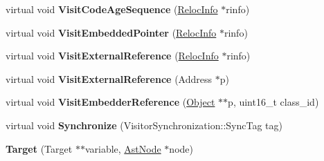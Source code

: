 \begin{DoxyCompactItemize}
\item 
\hypertarget{classv8_1_1internal_1_1_b_a_s_e___e_m_b_e_d_d_e_d_a784f217135268a1d65a614da296acf48}{}virtual void {\bfseries Visit\+Code\+Age\+Sequence} (\hyperlink{classv8_1_1internal_1_1_reloc_info}{Reloc\+Info} $\ast$rinfo)\label{classv8_1_1internal_1_1_b_a_s_e___e_m_b_e_d_d_e_d_a784f217135268a1d65a614da296acf48}

\item 
\hypertarget{classv8_1_1internal_1_1_b_a_s_e___e_m_b_e_d_d_e_d_af78b91de0e0d247404746211121b8a2e}{}virtual void {\bfseries Visit\+Embedded\+Pointer} (\hyperlink{classv8_1_1internal_1_1_reloc_info}{Reloc\+Info} $\ast$rinfo)\label{classv8_1_1internal_1_1_b_a_s_e___e_m_b_e_d_d_e_d_af78b91de0e0d247404746211121b8a2e}

\item 
\hypertarget{classv8_1_1internal_1_1_b_a_s_e___e_m_b_e_d_d_e_d_ae9355013687e3d39c76d4559bc3f508e}{}virtual void {\bfseries Visit\+External\+Reference} (\hyperlink{classv8_1_1internal_1_1_reloc_info}{Reloc\+Info} $\ast$rinfo)\label{classv8_1_1internal_1_1_b_a_s_e___e_m_b_e_d_d_e_d_ae9355013687e3d39c76d4559bc3f508e}

\item 
\hypertarget{classv8_1_1internal_1_1_b_a_s_e___e_m_b_e_d_d_e_d_a292f3fb5ff0cf55e0fd5fc94e221cbaf}{}virtual void {\bfseries Visit\+External\+Reference} (Address $\ast$p)\label{classv8_1_1internal_1_1_b_a_s_e___e_m_b_e_d_d_e_d_a292f3fb5ff0cf55e0fd5fc94e221cbaf}

\item 
\hypertarget{classv8_1_1internal_1_1_b_a_s_e___e_m_b_e_d_d_e_d_a0f65817da23d7b5280df2482d18adae3}{}virtual void {\bfseries Visit\+Embedder\+Reference} (\hyperlink{classv8_1_1internal_1_1_object}{Object} $\ast$$\ast$p, uint16\+\_\+t class\+\_\+id)\label{classv8_1_1internal_1_1_b_a_s_e___e_m_b_e_d_d_e_d_a0f65817da23d7b5280df2482d18adae3}

\item 
\hypertarget{classv8_1_1internal_1_1_b_a_s_e___e_m_b_e_d_d_e_d_a7af03d57b82b0d3a6602fb6579934b88}{}virtual void {\bfseries Synchronize} (Visitor\+Synchronization\+::\+Sync\+Tag tag)\label{classv8_1_1internal_1_1_b_a_s_e___e_m_b_e_d_d_e_d_a7af03d57b82b0d3a6602fb6579934b88}

\item 
\hypertarget{classv8_1_1internal_1_1_b_a_s_e___e_m_b_e_d_d_e_d_a03fb67788c8ae6926f995d829888aa33}{}{\bfseries Target} (Target $\ast$$\ast$variable, \hyperlink{classv8_1_1internal_1_1_ast_node}{Ast\+Node} $\ast$node)\label{classv8_1_1internal_1_1_b_a_s_e___e_m_b_e_d_d_e_d_a03fb67788c8ae6926f995d829888aa33}


\end{DoxyCompactItemize}
